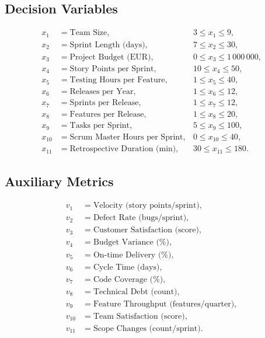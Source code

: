 \documentclass{article}
\begin{document}
\subsection*{Decision Variables}
\begin{align*}
x_1 &= \text{Team Size}, &3 \le x_1 \le 9,\\
x_2 &= \text{Sprint Length (days)}, &7 \le x_2 \le 30,\\
x_3 &= \text{Project Budget (EUR)}, &0 \le x_3 \le 1\,000\,000,\\
x_4 &= \text{Story Points per Sprint}, &10 \le x_4 \le 50,\\
x_5 &= \text{Testing Hours per Feature}, &1 \le x_5 \le 40,\\
x_6 &= \text{Releases per Year}, &1 \le x_6 \le 12,\\
x_7 &= \text{Sprints per Release}, &1 \le x_7 \le 12,\\
x_8 &= \text{Features per Release}, &1 \le x_8 \le 20,\\
x_9 &= \text{Tasks per Sprint}, &5 \le x_9 \le 100,\\
x_{10} &= \text{Scrum Master Hours per Sprint}, &0 \le x_{10} \le 40,\\
x_{11} &= \text{Retrospective Duration (min)}, &30 \le x_{11} \le 180.
\end{align*}

\subsection*{Auxiliary Metrics}
\begin{align*}
v_1 &= \text{Velocity (story points/sprint)},\\
v_2 &= \text{Defect Rate (bugs/sprint)},\\
v_3 &= \text{Customer Satisfaction (score)},\\
v_4 &= \text{Budget Variance (\%)},\\
v_5 &= \text{On-time Delivery (\%)},\\
v_6 &= \text{Cycle Time (days)},\\
v_7 &= \text{Code Coverage (\%)},\\
v_8 &= \text{Technical Debt (count)},\\
v_9 &= \text{Feature Throughput (features/quarter)},\\
v_{10} &= \text{Team Satisfaction (score)},\\
v_{11} &= \text{Scope Changes (count/sprint)}.
\end{align*}
\end{document}
